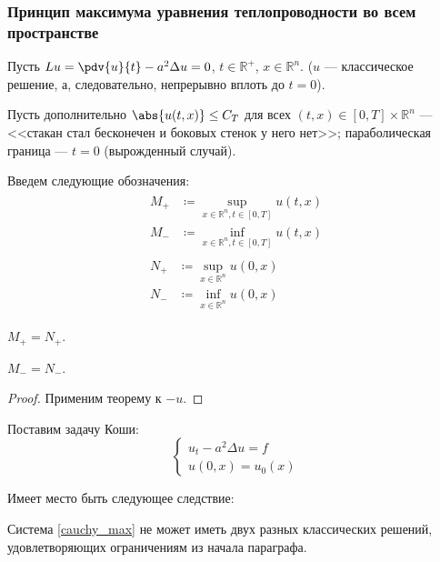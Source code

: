 \subsubsection{Принцип максимума уравнения теплопроводности во всем пространстве}

Пусть $Lu = \pdv{u}{t} - a^2 \Delta u = 0$, $t \in \mathbb{R}^+$, $x \in \mathbb{R}^n$. ($u$ --- классическое решение, а, следовательно, непрерывно вплоть до $t = 0$).

{\color{red} Пусть дополнительно $\abs{u(t, x)} \le C_T$ для всех $(t, x) \in [0, T] \times \mathbb{R}^n$} --- <<стакан стал бесконечен и боковых стенок у него нет>>; параболическая граница --- $t = 0$ (вырожденный случай).

Введем следующие обозначения:
\begin{align}
  \begin{aligned}
    M_+ &\coloneqq \sup_{x \in \mathbb{R}^n, t \in [0, T]} u(t, x) \\
    M_- &\coloneqq \inf_{x \in \mathbb{R}^n, t \in [0, T]} u(t, x) 
  \end{aligned} \\
  \begin{aligned}
    N_+ &\coloneqq \sup_{x \in \mathbb{R}^n} u(0, x) \\
    N_- &\coloneqq \inf_{x \in \mathbb{R}^n} u(0, x)
  \end{aligned}
\end{align}

\begin{thm}
  $M_+ = N_+$.
\end{thm}

\begin{cor}
  $M_- = N_-$.
\end{cor}

\begin{proof}
  Применим теорему к $-u$.
\end{proof}

Поставим задачу Коши:
\begin{equation}
  \left\{\begin{aligned}
  u_t - a^2 \Delta u = f \\
  u(0, x) = u_0(x)
  \end{aligned}\right. \label{cauchy_max}
\end{equation}

Имеет место быть следующее следствие:

\begin{cor}
  Система \eqref{cauchy_max} не может иметь двух разных классических решений, удовлетворяющих ограничениям из начала параграфа.
\end{cor}

